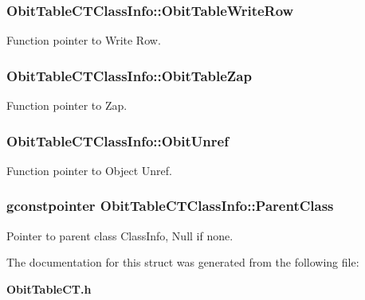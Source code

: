 \subsubsection{ {\bf Obit\-Table\-CTClass\-Info::Obit\-Table\-Write\-Row}}\label{structObitTableCTClassInfo_o26}


Function pointer to Write Row. 

\subsubsection{ {\bf Obit\-Table\-CTClass\-Info::Obit\-Table\-Zap}}\label{structObitTableCTClassInfo_o19}


Function pointer to Zap. 

\subsubsection{ {\bf Obit\-Table\-CTClass\-Info::Obit\-Unref}}\label{structObitTableCTClassInfo_o11}


Function pointer to Object Unref. 

\subsubsection{\setlength{\rightskip}{0pt plus 5cm}gconstpointer {\bf Obit\-Table\-CTClass\-Info::Parent\-Class}}\label{structObitTableCTClassInfo_o3}


Pointer to parent class Class\-Info, Null if none. 



The documentation for this struct was generated from the following file:\begin{CompactItemize}
\item 
{\bf Obit\-Table\-CT.h}\end{CompactItemize}
